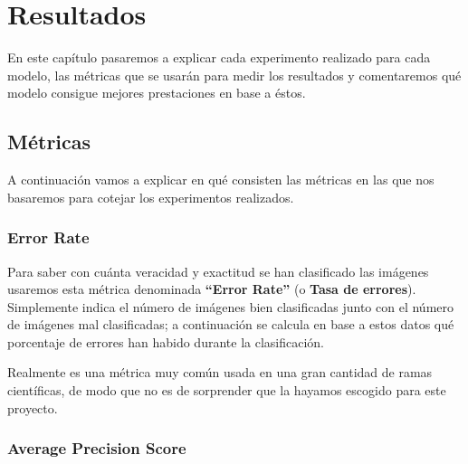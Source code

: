 \chapter{Resultados}
\label{ch:res}

En este capítulo pasaremos a explicar cada experimento realizado para cada modelo, las métricas que se usarán para medir los resultados y comentaremos qué modelo consigue mejores prestaciones en base a éstos.

\section{Métricas}

A continuación vamos a explicar en qué consisten las métricas en las que nos basaremos para cotejar los experimentos realizados.

\subsection{Error Rate}

Para saber con cuánta veracidad y exactitud se han clasificado las imágenes usaremos esta métrica denominada \textbf{``Error Rate''} (o \textbf{Tasa de errores}). Simplemente indica el número de imágenes bien clasificadas junto con el número de imágenes mal clasificadas; a continuación se calcula en base a estos datos qué porcentaje de errores han habido durante la clasificación.

Realmente es una métrica muy común usada en una gran cantidad de ramas científicas, de modo que no es de sorprender que la hayamos escogido para este proyecto.


\subsection{Average Precision Score}

